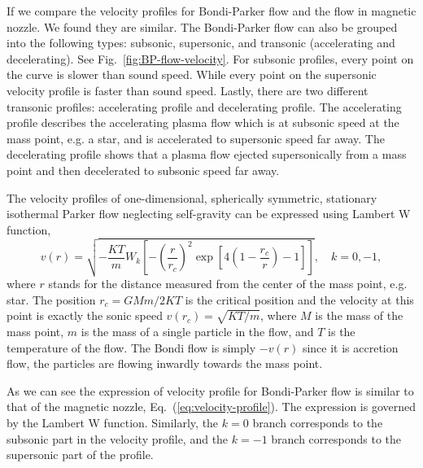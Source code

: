 If we compare the velocity profiles for Bondi-Parker flow and the flow in magnetic nozzle. We found they are similar. The Bondi-Parker flow can also be grouped into the following types: subsonic, supersonic, and transonic (accelerating and decelerating). See Fig.~\ref{fig:BP-flow-velocity}. For subsonic profiles, every point on the curve is slower than sound speed. While every point on the supersonic velocity profile is faster than sound speed. Lastly, there are two different transonic profiles: accelerating profile and decelerating profile. The accelerating profile describes the accelerating plasma flow which is at subsonic speed at the mass point, e.g. a star, and is accelerated to supersonic speed far away. The decelerating profile shows that a plasma flow ejected supersonically from a mass point and then decelerated to subsonic speed far away.

The velocity profiles of one-dimensional, spherically symmetric, stationary isothermal Parker flow neglecting self-gravity can be expressed using Lambert W function,
\begin{equation}
	v(r) = \sqrt{-\frac{KT}{m}W_k\left[ -\left(\frac{r}{r_c}\right)^2 \exp\left[4\left(1-\frac{r_c}{r}\right)-1\right] \right]}, \quad
	k = 0,-1,
\end{equation}
where $r$ stands for the distance measured from the center of the mass point, e.g. star. The position $r_c=GMm/2KT$ is the critical position and the velocity at this point is exactly the sonic speed $v(r_c)=\sqrt{KT/m}$, where $M$ is the mass of the mass point, $m$ is the mass of a single particle in the flow, and $T$ is the temperature of the flow. The Bondi flow is simply $-v(r)$ since it is accretion flow, the particles are flowing inwardly towards the mass point.

As we can see the expression of velocity profile for Bondi-Parker flow is similar to that of the magnetic nozzle, Eq.~(\ref{eq:velocity-profile}). The expression is governed by the Lambert W function. Similarly, the $k=0$ branch corresponds to the subsonic part in the velocity profile, and the $k=-1$ branch corresponds to the supersonic part of the profile.


